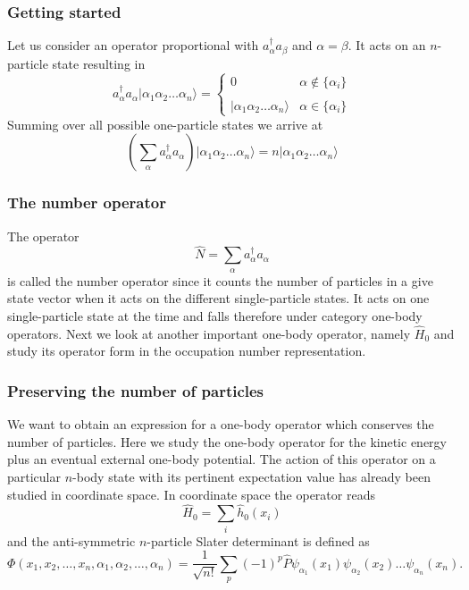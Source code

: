 \documentclass{beamer}
\begin{document}
\begin{frame}
\frametitle{Getting started}

Let us consider an operator proportional with $a_\alpha^{\dagger} a_\beta$ and 
$\alpha=\beta$. It acts on an $n$-particle state 
resulting in
\begin{equation}
	a_\alpha^{\dagger} a_\alpha |\alpha_1\alpha_2 \dots \alpha_{n}\rangle = 
	\begin{cases}
		0  &\alpha \notin \{\alpha_i\} \\
		\\
		|\alpha_1\alpha_2 \dots \alpha_{n}\rangle & \alpha \in \{\alpha_i\}
	\end{cases}
\end{equation}
Summing over all possible one-particle states we arrive at
\begin{equation}
	\left( \sum_\alpha a_\alpha^{\dagger} a_\alpha \right) |\alpha_1\alpha_2 \dots \alpha_{n}\rangle = 
	n |\alpha_1\alpha_2 \dots \alpha_{n}\rangle \label{eq:2-21}
\end{equation}
\end{frame}

\begin{frame}
\frametitle{The number operator}

The operator 
\begin{equation}
	\hat{N} = \sum_\alpha a_\alpha^{\dagger} a_\alpha \label{eq:2-22}
\end{equation}
is called the number operator since it counts the number of particles in a give state vector when it acts 
on the different single-particle states.  It acts on one single-particle state at the time and falls 
therefore under category one-body operators.
Next we look at another important one-body operator, namely $\hat{H}_0$ and study its operator form in the 
occupation number representation.
\end{frame}

\begin{frame}
\frametitle{Preserving the number of particles}

We want to obtain an expression for a one-body operator which conserves the number of particles.
Here we study the one-body operator for the kinetic energy plus an eventual external one-body potential.
The action of this operator on a particular $n$-body state with its pertinent expectation value has already
been studied in coordinate  space.
In coordinate space the operator reads
\begin{equation}
	\hat{H}_0 = \sum_i \hat{h}_0(x_i) \label{eq:2-23}
\end{equation}
and the anti-symmetric $n$-particle Slater determinant is defined as 
\[
\Phi(x_1, x_2,\dots ,x_n,\alpha_1,\alpha_2,\dots, \alpha_n)= \frac{1}{\sqrt{n!}} \sum_p (-1)^p\hat{P}\psi_{\alpha_1}(x_1)\psi_{\alpha_2}(x_2) \dots \psi_{\alpha_n}(x_n).
\]
\end{frame}
\end{document}
